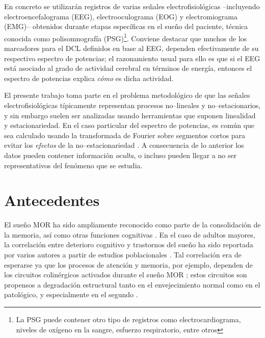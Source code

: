 En concreto se utilizarán registros de varias señales electrofisiológicas --incluyendo 
electroencefalograma (EEG), electrooculograma (EOG) y electromiograma (EMG)-- obtenidos durante 
etapas específicas en el sueño del paciente, técnica conocida como polisomnografía (PSG)\footnote{La 
PSG puede contener otro tipo de registros como electrocardiograma, niveles de oxígeno en la sangre, 
esfuerzo respiratorio, entre otros}.
%
Conviene destacar que muchos de los marcadores para el DCL definidos en base al EEG, dependen
efectivamente de su respectivo espectro de potencias; el razonamiento usual para ello es que si el 
EEG está asociado al grado de actividad cerebral en términos de energía, entonces el espectro de 
potencias explica \textit{cómo} es dicha actividad.

El presente trabajo toma parte en el problema metodológico de que las señales 
electrofisiológicas típicamente representan procesos no--lineales y no--estacionarios, y sin 
embargo suelen ser analizadas usando herramientas que suponen linealidad y estacionariedad.
%
En el caso particular del espectro de potencias, es común que sea calculado usando la 
transformada de Fourier sobre segmentos cortos para evitar los \textit{efectos} de la 
no--estacionariedad \cite{Kaiser00}.
%
A consecuencia de lo anterior los datos pueden contener información \textit{oculta}, o incluso 
pueden llegar a no ser representativos del fenómeno que se estudia. 
%


\section{Antecedentes}

El sueño MOR ha sido ampliamente reconocido como parte de la consolidación de la memoria, así como
otras funciones cognitivas 
\cite{Fishbein1971,Fishbein1977,Lucero1970,Pearlman1971,Pearlman1974,Smith1991}.
%
En el caso de adultos mayores, la correlación entre deterioro cognitivo y trastornos del sueño ha 
sido reportada por varios autores a partir de estudios poblacionales 
\cite{Amer13,Miyata13,Reid06,Potvin12}.
%
Tal correlación era de esperarse ya que los procesos de atención y memoria, por ejemplo, dependen de 
los circuitos colinérgicos activados durante el sueño MOR \cite{Braun1997}; estos circuitos son 
propensos a degradación estructural tanto en el envejecimiento normal como en el patológico,  y 
especialmente en el segundo \cite{Schliebs11}.

